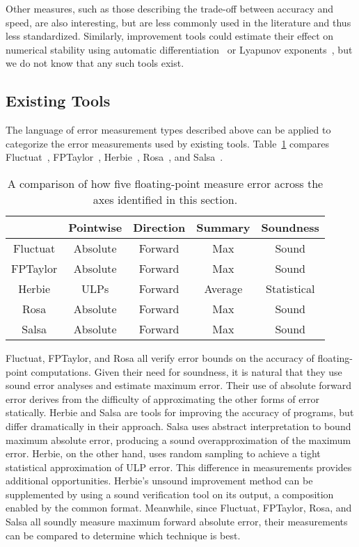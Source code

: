 \documentclass[main.tex]{subfiles}
\begin{document}
Other measures,
  such as those describing the trade-off between accuracy and speed,
  are also interesting, but are less commonly used in the literature
  and thus less standardized.
Similarly,
  improvement tools could estimate their effect on numerical stability
  using automatic differentiation~\cite{} or Lyapunov exponents~\cite{},
  but we do not know that any such tools exist.

\subsection{Existing Tools}

The language of error measurement types described above
  can be applied to categorize the error measurements
  used by existing tools.
Table~\ref{tbl:tools} compares Fluctuat~\cite{Goubault13},
  FPTaylor~\cite{fptaylor-fm15}, Herbie~\cite{pavel15},
  Rosa~\cite{DarulovaK14}, and Salsa~\cite{fmics15}.

\begin{table}[htb]
  \centering
\begin{tabular}{ccccc}
         & Pointwise & Direction & Summary & Soundness \\\hline 
Fluctuat & Absolute        & Forward & Max      & Sound \\
FPTaylor & Absolute        & Forward & Max      & Sound \\
Herbie   & ULPs            & Forward & Average     & Statistical \\
Rosa     & Absolute        & Forward & Max      & Sound \\
Salsa    & Absolute        & Forward & Max      & Sound
\end{tabular}
\caption{A comparison of how five floating-point measure error
  across the axes identified in this section.}
\label{tbl:tools}
\end{table}

Fluctuat, FPTaylor, and Rosa all verify error bounds
  on the accuracy of floating-point computations.
Given their need for soundness, it is natural
  that they use sound error analyses and estimate maximum error.
Their use of absolute forward error derives from the difficulty
  of approximating the other forms of error statically.
Herbie and Salsa are tools for improving the accuracy of programs,
  but differ dramatically in their approach.
Salsa uses abstract interpretation to bound maximum absolute error,
  producing a sound overapproximation of the maximum error.
Herbie, on the other hand, uses random sampling to achieve
  a tight statistical approximation of ULP error.
This difference in measurements provides additional opportunities.
Herbie's unsound improvement method can be supplemented
  by using a sound verification tool on its output,
  a composition enabled by the common \core format.
Meanwhile, since Fluctuat, FPTaylor, Rosa, and Salsa
  all soundly measure maximum forward absolute error,
  their measurements can be compared to determine which technique is best.
\end{document}
